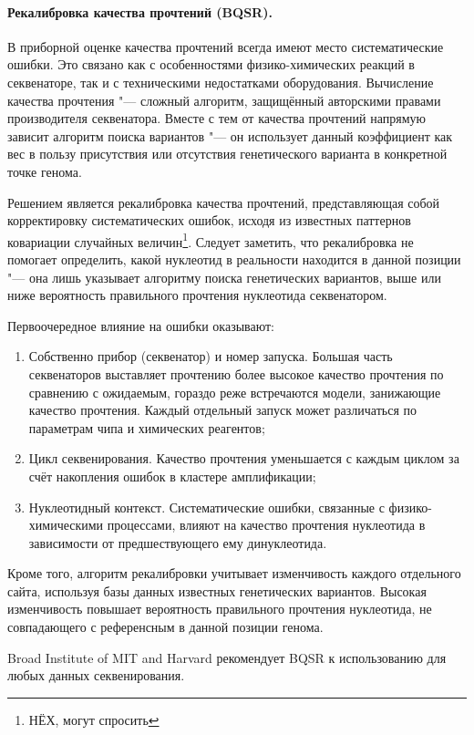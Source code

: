 \documentclass[a4paper,12pt]{article}
\begin{document}
\paragraph{Рекалибровка качества прочтений (BQSR).}
В приборной оценке качества прочтений всегда имеют место систематические ошибки.
Это связано как с особенностями физико-химических реакций в секвенаторе, так и с техническими недостатками оборудования.
Вычисление качества прочтения "--- сложный алгоритм, защищённый авторскими правами производителя секвенатора.
Вместе с тем от качества прочтений напрямую зависит алгоритм поиска вариантов "--- он использует данный коэффициент как вес в пользу присутствия или отсутствия генетического варианта в конкретной точке генома.

Решением является рекалибровка качества прочтений, представляющая собой корректировку систематических ошибок, исходя из известных паттернов ковариации случайных величин\footnote{НЁХ, могут спросить}.
Следует заметить, что рекалибровка не помогает определить, какой нуклеотид в реальности находится в данной позиции "--- она лишь указывает алгоритму поиска генетических вариантов, выше или ниже вероятность правильного прочтения нуклеотида секвенатором.

Первоочередное влияние на ошибки оказывают:

\begin{enumerate}
\item Собственно прибор (секвенатор) и номер запуска.
Большая часть секвенаторов выставляет прочтению более высокое качество прочтения по сравнению с ожидаемым, гораздо реже встречаются модели, занижающие качество прочтения\cite{Auwera_2013}.
Каждый отдельный запуск может различаться по параметрам чипа и химических реагентов;
\item Цикл секвенирования.
Качество прочтения уменьшается с каждым циклом за счёт накопления ошибок в кластере амплификации;
\item Нуклеотидный контекст.
Систематические ошибки, связанные с физико-химическими процессами, влияют на качество прочтения нуклеотида в зависимости от предшествующего ему динуклеотида.
\end{enumerate}

Кроме того, алгоритм рекалибровки учитывает изменчивость каждого отдельного сайта, используя базы данных известных генетических вариантов.
Высокая изменчивость повышает вероятность правильного прочтения нуклеотида, не совпадающего с референсным в данной позиции генома.

Broad Institute of MIT and Harvard рекомендует BQSR к использованию для любых данных секвенирования\cite{Auwera_2013}.
\end{document}

